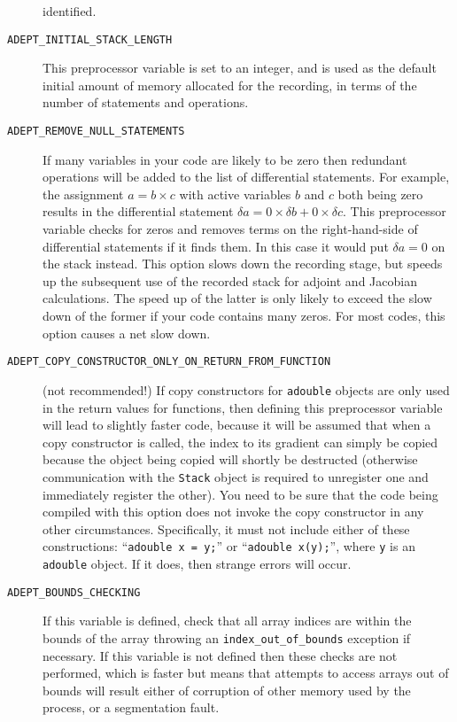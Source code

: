 \documentclass[a4,oneside]{book}
\def\codesize{\small}
\def\code#1{{\codesize\texttt{#1}}}
\def\citem#1{\item[{\codesize\texttt{#1}}]}
\begin{document}
\begin{description}
identified.
%
\citem{ADEPT\_INITIAL\_STACK\_LENGTH} This preprocessor variable is
set to an integer, and is used as the default initial amount of memory
allocated for the recording, in terms of the number of statements and
operations.
%
\citem{ADEPT\_REMOVE\_NULL\_STATEMENTS} If many variables in your code
are likely to be zero then redundant operations will be added to the
list of differential statements. For example, the assignment
$a=b\times c$ with active variables $b$ and $c$ both being zero
results in the differential statement $\delta a=0\times\delta
b+0\times\delta c$. This preprocessor variable checks for zeros and
removes terms on the right-hand-side of differential statements if it
finds them. In this case it would put $\delta a=0$ on the stack
instead. This option slows down the recording stage, but speeds up the
subsequent use of the recorded stack for adjoint and Jacobian
calculations. The speed up of the latter is only likely to exceed the
slow down of the former if your code contains many zeros. For most
codes, this option causes a net slow down.
%
\citem{ADEPT\_COPY\_CONSTRUCTOR\_ONLY\_ON\_RETURN\_FROM\_FUNCTION}
(not recommended!) If copy constructors for \code{adouble} objects are
only used in the return values for functions, then defining this
preprocessor variable will lead to slightly faster code, because it
will be assumed that when a copy constructor is called, the index to
its gradient can simply be copied because the object being copied will
shortly be destructed (otherwise communication with the \code{Stack}
object is required to unregister one and immediately register the
other). You need to be sure that the code being compiled with this
option does not invoke the copy constructor in any other
circumstances. Specifically, it must not include either of these
constructions: ``\code{adouble x = y;}'' or ``\code{adouble x(y);}'',
where \code{y} is an \code{adouble} object. If it does, then strange
errors will occur.
%
\citem{ADEPT\_BOUNDS\_CHECKING} If this variable is defined, check
that all array indices are within the bounds of the array throwing an
\code{index\_out\_of\_bounds} exception if necessary.  If this
variable is not defined then these checks are not performed, which is
faster but means that attempts to access arrays out of bounds will
result either of corruption of other memory used by the process, or a
segmentation fault. 
\end{description}
\end{document}
